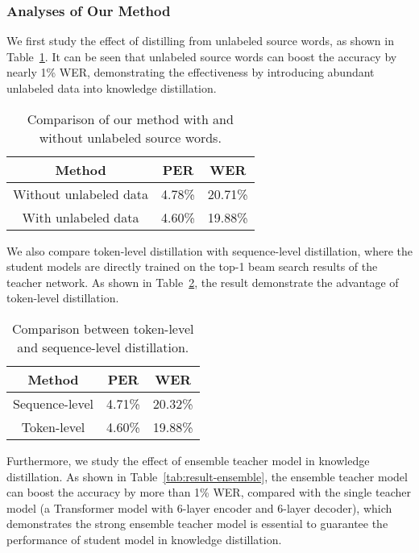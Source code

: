 \documentclass[a4paper]{article}
\begin{document}
\subsubsection{Analyses of Our Method }
We first study the effect of distilling from unlabeled source words, as shown in Table~\ref{tab:result2}. It can be seen that
unlabeled source words can boost the accuracy by nearly 1\% WER, demonstrating the effectiveness by introducing abundant unlabeled data into knowledge distillation.
\vspace{-0.1cm}
\begin{table}[th]
  \caption{Comparison of our method with and without unlabeled source words.}
  \label{tab:result2}
  \centering
  \begin{tabular}{ccc}
   \toprule
    \textbf{Method}                     & \textbf{PER} &\textbf{WER}          \\
    \midrule
      Without unlabeled data      &4.78\%&20.71\%           \\
      With unlabeled data   &4.60\%&19.88\%            \\
    \bottomrule
  \end{tabular}
\end{table}
\vspace{-0.1cm}
We also compare token-level distillation with sequence-level distillation, where the student models are directly trained on the top-1 beam search results of the teacher network. As shown in Table~\ref{tab:token}, the result demonstrate the advantage of token-level distillation.
\vspace{-0.1cm}
\begin{table}[th]
  \caption{Comparison between token-level and sequence-level distillation.}
  \label{tab:token}
  \centering
  \begin{tabular}{ccc}
   \toprule
    \textbf{Method}                     & \textbf{PER} &\textbf{WER}          \\
    \midrule
      Sequence-level      &4.71\%&20.32\%           \\
      Token-level  &4.60\%&19.88\%            \\
    \bottomrule
  \end{tabular}
\end{table}
\vspace{-0.3cm}
Furthermore, we study the effect of ensemble teacher model in knowledge distillation. As shown in Table~\ref{tab:result-ensemble}, the ensemble teacher model can boost the accuracy by more than 1\% WER, compared with the single teacher model (a Transformer model with 6-layer encoder and 6-layer decoder), which demonstrates the strong ensemble teacher model is essential to guarantee the performance of student model in knowledge distillation.
\end{document}

